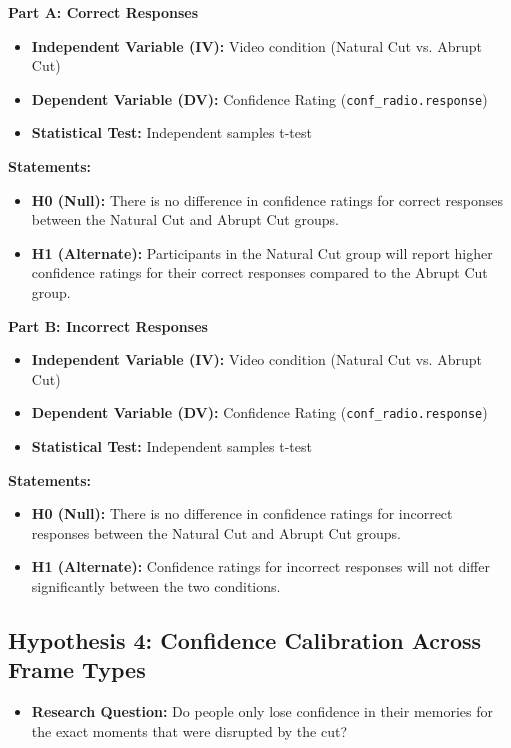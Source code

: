 \documentclass[10pt,a4paper]{article}
\begin{document}
\textbf{Part A: Correct Responses}
\begin{itemize}
    \item \textbf{Independent Variable (IV):} Video condition (Natural Cut vs. Abrupt Cut)
    \item \textbf{Dependent Variable (DV):} Confidence Rating (\texttt{conf\_radio.response})
    \item \textbf{Statistical Test:} Independent samples t-test
\end{itemize}

\textbf{Statements:}
\begin{itemize}
    \item \textbf{H0 (Null):} There is no difference in confidence ratings for correct responses between the Natural Cut and Abrupt Cut groups.
    \item \textbf{H1 (Alternate):} Participants in the Natural Cut group will report higher confidence ratings for their correct responses compared to the Abrupt Cut group.
\end{itemize}

\textbf{Part B: Incorrect Responses}
\begin{itemize}
    \item \textbf{Independent Variable (IV):} Video condition (Natural Cut vs. Abrupt Cut)
    \item \textbf{Dependent Variable (DV):} Confidence Rating (\texttt{conf\_radio.response})
    \item \textbf{Statistical Test:} Independent samples t-test
\end{itemize}

\textbf{Statements:}
\begin{itemize}
    \item \textbf{H0 (Null):} There is no difference in confidence ratings for incorrect responses between the Natural Cut and Abrupt Cut groups.
    \item \textbf{H1 (Alternate):} Confidence ratings for incorrect responses will not differ significantly between the two conditions.
\end{itemize}

\subsection{Hypothesis 4: Confidence Calibration Across Frame Types}
\begin{itemize}
    \item \textbf{Research Question:} Do people only lose confidence in their memories for the exact moments that were disrupted by the cut?
\end{itemize}
\end{document}
